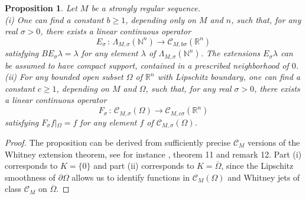 \documentclass[a4paper]{amsart}
\theoremstyle{plain}
\newtheorem{prop}[subsubsection]{Proposition}
\theoremstyle{definition}
\theoremstyle{remark}
\begin{document}
\begin{prop}\label{extclassic}
Let $ M $ be a strongly regular sequence.\\
(i) One can find a constant
$ b\geq 1 $, depending only on $ M $ and $ n $,
such that, for any real $ \sigma>0 $, there exists a linear continuous operator
\begin{equation*}
E_\sigma\, :\, \Lambda_{M,\sigma}(\mathbb{N}^n)\longrightarrow \mathcal{C}_{M,b\sigma}(\mathbb{R}^n)
\end{equation*}
satisfying $ BE_\sigma \lambda=\lambda $ for any element $ \lambda $ of $ \Lambda_{M,\sigma}(\mathbb{N}^n) $. The extensions $ E_\sigma\lambda $ can be assumed
to have compact support, contained in a prescribed neighborhood of $ 0 $.\\
(ii) For any bounded open subset $ \Omega $ of $ \mathbb{R}^n $ with 
Lipschitz boundary, one can find a constant
$ c\geq 1 $, depending on $ M $ and $ \Omega $, such that, for any real $ \sigma>0 $, there exists a linear continuous operator
\begin{equation*}
F_\sigma\, :\, \mathcal{C}_{M,\sigma}(\Omega)\longrightarrow \mathcal{C}_{M,c\sigma}(\mathbb{R}^n)
\end{equation*}
satisfying $ F_\sigma f\left\vert_\Omega\right.=f $ for any element 
$ f $ of $ \mathcal{C}_{M,\sigma}(\Omega) $.
\end{prop} 
\begin{proof}  
The proposition can be derived from sufficiently precise $ \mathcal{C}_M $ versions of 
the Whitney extension theorem, see for
instance \cite{CC2}, theorem 11 and remark 12. Part (i) corresponds to $ K=\{0\} $ and part (ii) corresponds to $ K=\overline{\Omega} $, since
the Lipschitz smoothness of $ \partial \Omega $ allows us to identify
functions in $ \mathcal{C}_M(\Omega) $ and Whitney jets of class $ \mathcal{C}_M $ on $ \overline{\Omega} $. 
\end{proof}
\end{document}
